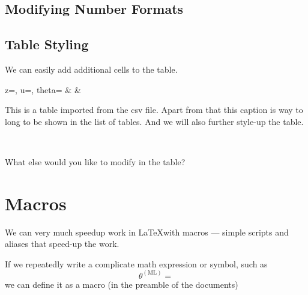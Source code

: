 \documentclass[a4paper,10pt]{report} %
\begin{document}
\subsection{Modifying Number Formats}

\newpage 
\subsection{Table Styling}

  We can easily add additional cells to the table.
  
  \begin{table}[h!] \label{tab:styled}
  \begin{center}
  {  z=\zvec, u=\uvec, theta=\thvec    %
  }{%
     \zvec  & \uvec & \thvec        %
  } %
  \caption[short table description]{This is a table imported from the csv file. Apart from that this caption is way to long to be shown in the list of tables. And we will also further style-up the table. }
  \end{center}
\end{table} ~\vspace{1ex}
  
  What else would you like to modify in the table?


\section{Macros}
We can very much speedup work in \LaTeX with macros --- simple scripts and aliases that speed-up the work.

If we repeatedly write a complicate math expression or symbol, such as
\[ \theta^{\scriptscriptstyle \mathrm{(ML)}} =  \]
we can define it as a macro (in the preamble of the documents)
\end{document}

